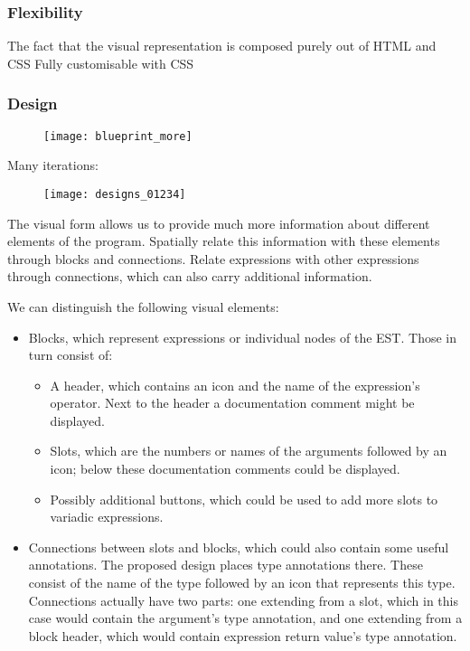 \subsubsection{Flexibility}
The fact that the visual representation is composed purely out of HTML and CSS
Fully customisable with CSS

\subsubsection{Design}
\begin{figure}[h!]
\centering \texttt{[image: blueprint\_more]}
\caption{}
\label{fig:blueprint_more}
\end{figure}

Many iterations:

\begin{figure}[h!]
\centering \texttt{[image: designs\_01234]}
\caption{}
\label{fig:designs_01234}
\end{figure}

The visual form allows us to provide much more information about different
elements of the program.  Spatially relate this information with these elements
through blocks and connections.  Relate expressions with other expressions
through connections, which can also carry additional information.

We can distinguish the following visual elements:
\begin{itemize}
	\item Blocks, which represent expressions or individual nodes of the
          EST. Those in turn consist of:
	\begin{itemize}
		\item A header, which contains an icon and the name of the
                  expression's operator. Next to the header a documentation
                  comment might be displayed.
		\item Slots, which are the numbers or names of the arguments
                  followed by an icon; below these documentation comments could
                  be displayed.
		\item Possibly additional buttons, which could be used to add
                  more slots to variadic expressions.
	\end{itemize}
	\item Connections between slots and blocks, which could also contain
          some useful annotations. The proposed design places type annotations
          there. These consist of the name of the type followed by an icon that
          represents this type. Connections actually have two parts: one
          extending from a slot, which in this case would contain the argument's
          type annotation, and one extending from a block header, which would
          contain expression return value's type annotation.
\end{itemize}

